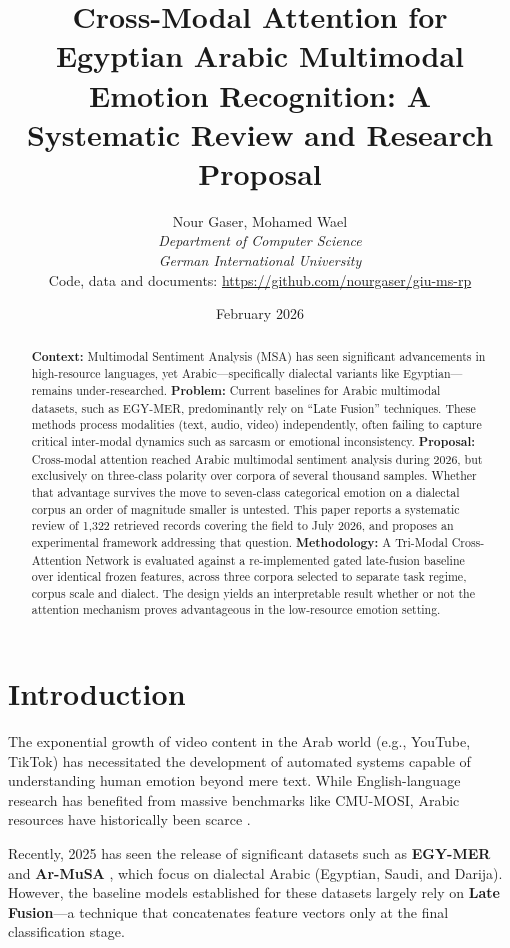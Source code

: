 \documentclass[12pt, a4paper]{article}
\title{\textbf{Cross-Modal Attention for Egyptian Arabic Multimodal Emotion Recognition: A Systematic Review and Research Proposal}}
\author{Nour Gaser, Mohamed Wael \\ 
\textit{Department of Computer Science} \\ 
\textit{German International University} \\[0.4em]
\small Code, data and documents: \url{https://github.com/nourgaser/giu-ms-rp}}
\date{February 2026}
\begin{document}
\maketitle

\begin{abstract}
    \textbf{Context:} Multimodal Sentiment Analysis (MSA) has seen significant advancements in high-resource languages, yet Arabic---specifically dialectal variants like Egyptian---remains under-researched.
    \textbf{Problem:} Current baselines for Arabic multimodal datasets, such as EGY-MER, predominantly rely on ``Late Fusion'' techniques. These methods process modalities (text, audio, video) independently, often failing to capture critical inter-modal dynamics such as sarcasm or emotional inconsistency.
    \textbf{Proposal:} Cross-modal attention reached Arabic multimodal sentiment analysis during 2026, but exclusively on three-class polarity over corpora of several thousand samples. Whether that advantage survives the move to seven-class categorical emotion on a dialectal corpus an order of magnitude smaller is untested. This paper reports a systematic review of 1{,}322 retrieved records covering the field to July 2026, and proposes an experimental framework addressing that question.
    \textbf{Methodology:} A Tri-Modal Cross-Attention Network is evaluated against a re-implemented gated late-fusion baseline over identical frozen features, across three corpora selected to separate task regime, corpus scale and dialect. The design yields an interpretable result whether or not the attention mechanism proves advantageous in the low-resource emotion setting.
\end{abstract}


\section{Introduction}\label{sec:intro}
The exponential growth of video content in the Arab world (e.g., YouTube, TikTok) has necessitated the development of automated systems capable of understanding human emotion beyond mere text. While English-language research has benefited from massive benchmarks like CMU-MOSI, Arabic resources have historically been scarce \citep{Haouhat2023}.

Recently, 2025 has seen the release of significant datasets such as \textbf{EGY-MER} \citep{Hussein2025} and \textbf{Ar-MuSA} \citep{Khaled2025}, which focus on dialectal Arabic (Egyptian, Saudi, and Darija). However, the baseline models established for these datasets largely rely on \textbf{Late Fusion}---a technique that concatenates feature vectors only at the final classification stage.
\end{document}
